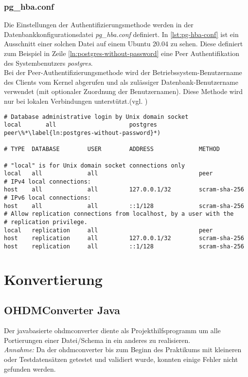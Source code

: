 \newpage
\subsection{pg\_hba.conf}
Die Einstellungen der Authentifizierungsmethode werden in der Datenbankkonfigurationsdatei \textit{pg\_hba.conf} definiert. In \autoref{lst:pg-hba-conf} ist ein Ausschnitt einer solchen Datei auf einem Ubuntu 20.04 zu sehen. Diese definiert zum Beispiel in Zeile \ref{ln:postgres-without-password} eine Peer Authentifikation des Systembenutzers \textit{postgres}.\\
Bei der Peer-Authentifizierungsmethode wird der Betriebssystem-Benutzername des Clients vom Kernel abgerufen und als zulässiger Datenbank-Benutzername verwendet (mit optionaler Zuordnung der Benutzernamen). Diese Methode wird nur bei lokalen Verbindungen unterstützt.(vgl. \autocite{peer-authentification})
\begin{lstlisting}[caption={pg\_hba.conf Ausschnitt},label={lst:pg-hba-conf},deletekeywords={all}]
# Database administrative login by Unix domain socket
local		all				 		postgres	       					     peer\%*\label{ln:postgres-without-password}*)

# TYPE  DATABASE    	USER        ADDRESS             METHOD

# "local" is for Unix domain socket connections only
local   all         	all                             peer
# IPv4 local connections:
host    all         	all         127.0.0.1/32        scram-sha-256
# IPv6 local connections:
host    all         	all         ::1/128             scram-sha-256
# Allow replication connections from localhost, by a user with the
# replication privilege.
local   replication 	all                             peer
host    replication 	all         127.0.0.1/32        scram-sha-256
host    replication 	all         ::1/128             scram-sha-256
\end{lstlisting}

\chapter{Konvertierung}
\section{OHDMConverter Java}
Der javabasierte \gls{ohdmconverter} diente als Projekthilfsprogramm um alle Portierungen einer Datei/Schema in ein anderes zu realisieren.\\
\textit{Annahme:} Da der \gls{ohdmconverter} bis zum Beginn des Praktikums  mit kleineren oder Testdatensätzen getestet und validiert wurde, konnten einige Fehler nicht gefunden werden.

